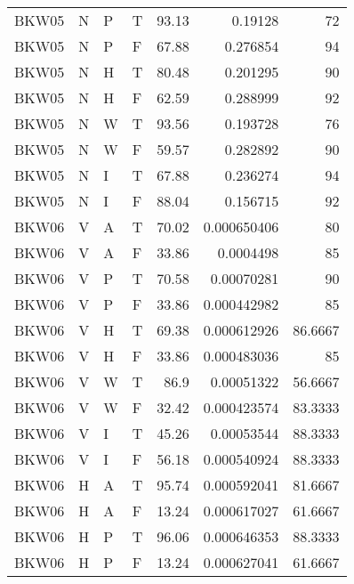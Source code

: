 \begin{longtable}{llllrrr}
    BKW05    & N     & P     & T          & 93.13      & 0.19128     & 72       \\
    BKW05    & N     & P     & F          & 67.88      & 0.276854    & 94       \\
    BKW05    & N     & H     & T          & 80.48      & 0.201295    & 90       \\
    BKW05    & N     & H     & F          & 62.59      & 0.288999    & 92       \\
    BKW05    & N     & W     & T          & 93.56      & 0.193728    & 76       \\
    BKW05    & N     & W     & F          & 59.57      & 0.282892    & 90       \\
    BKW05    & N     & I     & T          & 67.88      & 0.236274    & 94       \\
    BKW05    & N     & I     & F          & 88.04      & 0.156715    & 92       \\
    BKW06    & V     & A     & T          & 70.02      & 0.000650406 & 80       \\
    BKW06    & V     & A     & F          & 33.86      & 0.0004498   & 85       \\
    BKW06    & V     & P     & T          & 70.58      & 0.00070281  & 90       \\
    BKW06    & V     & P     & F          & 33.86      & 0.000442982 & 85       \\
    BKW06    & V     & H     & T          & 69.38      & 0.000612926 & 86.6667  \\
    BKW06    & V     & H     & F          & 33.86      & 0.000483036 & 85       \\
    BKW06    & V     & W     & T          & 86.9       & 0.00051322  & 56.6667  \\
    BKW06    & V     & W     & F          & 32.42      & 0.000423574 & 83.3333  \\
    BKW06    & V     & I     & T          & 45.26      & 0.00053544  & 88.3333  \\
    BKW06    & V     & I     & F          & 56.18      & 0.000540924 & 88.3333  \\
    BKW06    & H     & A     & T          & 95.74      & 0.000592041 & 81.6667  \\
    BKW06    & H     & A     & F          & 13.24      & 0.000617027 & 61.6667  \\
    BKW06    & H     & P     & T          & 96.06      & 0.000646353 & 88.3333  \\
    BKW06    & H     & P     & F          & 13.24      & 0.000627041 & 61.6667  \\

\end{longtable}

